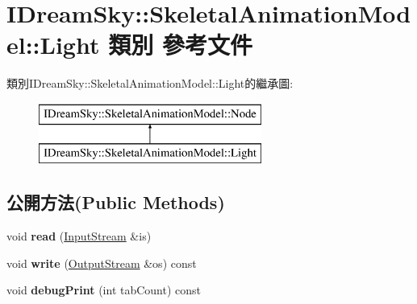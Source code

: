 \hypertarget{class_i_dream_sky_1_1_skeletal_animation_model_1_1_light}{}\section{I\+Dream\+Sky\+:\+:Skeletal\+Animation\+Model\+:\+:Light 類別 參考文件}
\label{class_i_dream_sky_1_1_skeletal_animation_model_1_1_light}
類別\+I\+Dream\+Sky\+:\+:Skeletal\+Animation\+Model\+:\+:Light的繼承圖\+:\begin{figure}[H]
\begin{center}
\leavevmode
\includegraphics[height=2.000000cm]{class_i_dream_sky_1_1_skeletal_animation_model_1_1_light}
\end{center}
\end{figure}
\subsection*{公開方法(Public Methods)}
\begin{DoxyCompactItemize}
\item 
void {\bfseries read} (\hyperlink{class_i_dream_sky_1_1_input_stream}{Input\+Stream} \&is)\hypertarget{class_i_dream_sky_1_1_skeletal_animation_model_1_1_light_a7ad7a42541174d69c416573eea599a13}{}\label{class_i_dream_sky_1_1_skeletal_animation_model_1_1_light_a7ad7a42541174d69c416573eea599a13}

\item 
void {\bfseries write} (\hyperlink{class_i_dream_sky_1_1_output_stream}{Output\+Stream} \&os) const \hypertarget{class_i_dream_sky_1_1_skeletal_animation_model_1_1_light_ae0b8d969cdcdd4220fbc4af03d5d7d6a}{}\label{class_i_dream_sky_1_1_skeletal_animation_model_1_1_light_ae0b8d969cdcdd4220fbc4af03d5d7d6a}

\item 
void {\bfseries debug\+Print} (int tab\+Count) const \hypertarget{class_i_dream_sky_1_1_skeletal_animation_model_1_1_light_a3239b27018431ec1fafc98815de4af7a}{}\label{class_i_dream_sky_1_1_skeletal_animation_model_1_1_light_a3239b27018431ec1fafc98815de4af7a}

\end{DoxyCompactItemize}

